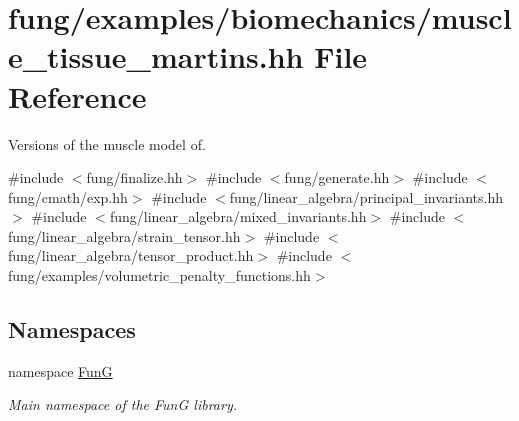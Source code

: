 \hypertarget{muscle__tissue__martins_8hh}{\section{fung/examples/biomechanics/muscle\-\_\-tissue\-\_\-martins.hh \-File \-Reference}
\label{muscle__tissue__martins_8hh}
}


\-Versions of the muscle model of.  


{\ttfamily \#include $<$fung/finalize.\-hh$>$}\*
{\ttfamily \#include $<$fung/generate.\-hh$>$}\*
{\ttfamily \#include $<$fung/cmath/exp.\-hh$>$}\*
{\ttfamily \#include $<$fung/linear\-\_\-algebra/principal\-\_\-invariants.\-hh$>$}\*
{\ttfamily \#include $<$fung/linear\-\_\-algebra/mixed\-\_\-invariants.\-hh$>$}\*
{\ttfamily \#include $<$fung/linear\-\_\-algebra/strain\-\_\-tensor.\-hh$>$}\*
{\ttfamily \#include $<$fung/linear\-\_\-algebra/tensor\-\_\-product.\-hh$>$}\*
{\ttfamily \#include $<$fung/examples/volumetric\-\_\-penalty\-\_\-functions.\-hh$>$}\*
\subsection*{\-Namespaces}
\begin{DoxyCompactItemize}
\item 
namespace \hyperlink{namespaceFunG}{\-Fun\-G}
\begin{DoxyCompactList}\small\item\em \-Main namespace of the \-Fun\-G library. \end{DoxyCompactList}\end{DoxyCompactItemize}

